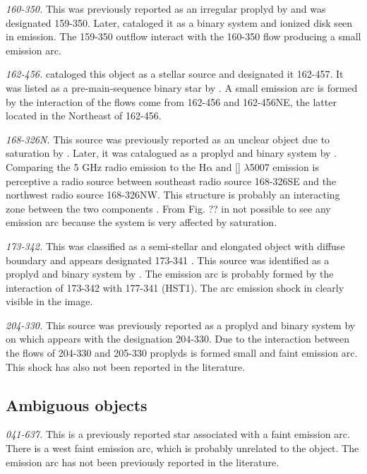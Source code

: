 \documentclass[apj, twocolumn]{aastex63}
\newcommand\oiii{[\ion{O}{3}]}
\newcommand\ha{\ensuremath{\mathrm{H\alpha}}}
\renewcommand\clearpage{}
\begin{document}
\textit{160-350.} This was previously reported as an irregular proplyd
by \citet{ODell:1994a} and was designated 159-350. Later, \citet{Ricci:2008a}
cataloged it as a binary system and ionized disk seen in emission.
The 159-350 outflow interact with the 160-350 flow producing a small
emission arc.  

\textit{162-456.} \citet{ODell:1996a} cataloged this object as a stellar
source and designated it 162-457. It was listed as a pre-main-sequence
binary star by \citet{Reipurth:2007a}. A small emission arc is formed by
the interaction of the flows come from 162-456 and 162-456NE, the latter
located in the Northeast of 162-456.     

\textit{168-326N.} This source was previously reported as an unclear object
due to saturation by \citet{ODell:1994a}. Later, it was catalogued as a proplyd
and binary system by \citet{Ricci:2008a}. Comparing the 5 GHz radio emission
to the \ha{} and \oiii{} $\lambda$5007 emission is perceptive a radio source
between southeast radio source 168-326SE and the northwest radio source
168-326NW. This structure is probably an interacting zone between the two
components \citep{Graham:2002a}. From Fig. ?? in not possible to see
any emission arc because the system is very affected by saturation.    

\textit{173-342.} This was classified as a semi-stellar and elongated
object with diffuse boundary and appears designated 173-341 \citet{ODell:1994a}.
This source was identified as a proplyd and binary system by \citet{Ricci:2008a}.
The emission arc is probably formed by the interaction of 173-342 with
177-341 (HST1). The arc emission shock in clearly visible in the image. 

\textit{204-330.} This source was previously reported as a proplyd and binary
system by \citet{Ricci:2008a} on which appears with the designation 204-330.
Due to the interaction between the flows of 204-330 and 205-330 proplyds is
formed small and faint emission arc. This shock has also not been reported
in the literature.

\clearpage
\subsection{Ambiguous objects}
\label{sec:problematic-objects}

\textit{041-637.} This is a previously reported star \citep{Da-Rio:2009a}
associated with a faint emission arc. There is a west faint emission arc,
which is probably unrelated to the object. The emission arc has not been
previously reported in the literature.
\end{document}
